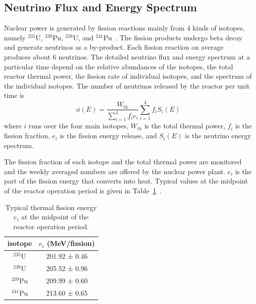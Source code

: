 \subsection{Neutrino Flux and Energy Spectrum}

Nuclear power is generated by fission reactions mainly from 4 kinds of isotopes, namely $^{235}$U, $^{239}$Pu, $^{238}$U, and $^{241}$Pu~\cite{Kopeikin2004}. The fission products undergo beta decay and generate neutrinos as a by-product. Each fission reaction on average produces about 6 neutrinos. The detailed neutrino flux and energy spectrum at a particular time depend on the relative abundances of the isotopes, the total reactor thermal power, the fission rate of individual isotopes, and the spectrum of the individual isotopes. The number of neutrinos released by the reactor per unit time is
\begin{equation} \label{eq:neutrino_flux}
  \phi(E)=\frac{W_{th}}{\sum\limits_{i=1}^4f_ie_i}\sum\limits_{i=1}^4f_iS_i(E)
\end{equation}
where $i$ runs over the four main isotopes, $W_{th}$ is the total thermal power, $f_i$ is the fission fraction, $e_i$ is the fission energy release, and $S_i(E)$ is the neutrino energy spectrum.

The fission fraction of each isotope and the total thermal power are monitored and the weekly averaged numbers are offered by the nuclear power plant. $e_i$ is the part of the fission energy that converts into heat. Typical values at the midpoint of the reactor operation period is given in Table~\ref{table:thermal_fission_energy}~\cite{Kopeikin2004}.
\begin{table}
	\centering
	\begin{tabular}{|c|c|}
	\hline
	isotope & $e_i$ (MeV/fission) \\
	\hline
	$^{235}$U & 201.92 ± 0.46 \\
	$^{238}$U & 205.52 ± 0.96 \\
	$^{239}$Pu & 209.99 ± 0.60 \\
	$^{241}$Pu & 213.60 ± 0.65 \\
	\hline
	\end{tabular}
	\caption{Typical thermal fission energy $e_i$ at the midpoint of the reactor operation period.}
	\label{table:thermal_fission_energy}
\end{table}

